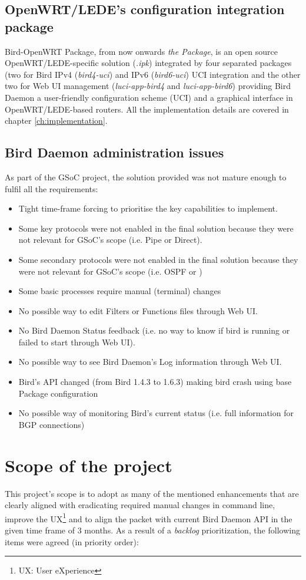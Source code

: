 \subsection{OpenWRT/LEDE's configuration integration package}
Bird-OpenWRT Package, from now onwards \textit{the Package}, is an open source OpenWRT/LEDE-specific solution (\textit{.ipk}) integrated by four separated packages (two for Bird IPv4 (\textit{bird4-uci}) and IPv6 (\textit{bird6-uci}) UCI integration and the other two for Web UI management (\textit{luci-app-bird4} and \textit{luci-app-bird6}) providing Bird Daemon a user-friendly configuration scheme (UCI) and a graphical interface in OpenWRT/LEDE-based routers. All the implementation details are covered in chapter \ref{ch:implementation}.

\subsection{Bird Daemon administration issues}
\label{subsec:bdai}
As part of the GSoC project, the solution provided was not mature enough to fulfil all the requirements:
\begin{itemize}
    \item Tight time-frame forcing to prioritise the key capabilities to implement.
    \item Some key protocols were not enabled in the final solution because they were not relevant for GSoC's scope (i.e. Pipe or Direct).
    \item Some secondary protocols were not enabled in the final solution because they were not relevant for GSoC's scope (i.e. OSPF or )
    \item Some basic processes require manual (terminal) changes
    \item No possible way to edit Filters or Functions files through Web UI.
    \item No Bird Daemon Status feedback (i.e. no way to know if bird is running or failed to start through Web UI).
    \item No possible way to see Bird Daemon's Log information through Web UI.
    \item Bird's API changed (from Bird 1.4.3 to 1.6.3) making bird crash using base Package configuration
    \item No possible way of monitoring Bird's current status (i.e. full information for BGP connections)
\end{itemize}
\section{Scope of the project}
\label{sec:sotp}
This project's scope is to adopt as many of the mentioned enhancements that are clearly aligned with eradicating required manual changes in command line, improve the UX\footnote{UX: User eXperience} and to align the packet with current Bird Daemon API in the given time frame of 3 months. As a result of a \textit{backlog} prioritization, the following items were agreed (in priority order):

